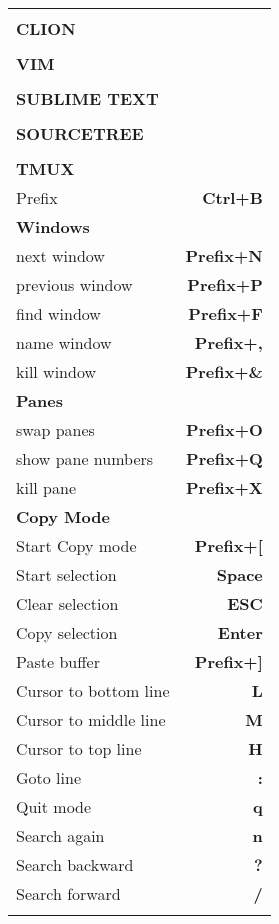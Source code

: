 \documentclass[9pt,a4paper,landscape,draft,sans]{scrartcl}
\makeatletter
\newcommand\Ctl{Ctrl}
\newcommand\Ent{Enter}
\newcommand\Prf{Prefix}
\newcommand\Esc{ESC}
\let\mcnewpage=\newpage
\newcommand{\TrickSupertabularIntoMulticols}{
  \renewcommand\newpage{
    \if@firstcolumn
      \hrule width\linewidth height0pt
      \columnbreak
    \else
      \mcnewpage
    \fi
  }
}
\newcommand{\theader}[1]{
    \rule{0pt}{6ex} \\
    \textbf{\uppercase{#1}} & \\
    \noalign{\global\arrayrulewidth=1.5pt}
    \hline
}
\newcommand{\tsubheader}[1]{
    \textbf{#1} & \\
    \noalign{\global\arrayrulewidth=0.5pt}
    \hline
}
\newcommand{\tshortcut}[2]{
    #1 & \textbf{#2} \\
    \noalign{\global\arrayrulewidth=0.5pt}
    \hline
}
\makeatother
\begin{document}
\begin{multicols}{3}

\TrickSupertabularIntoMulticols
\begin{supertabular}{@{}p{5cm}r@{}}
    \theader{CLion}
    \theader{Vim}
    \theader{Sublime text}
    \theader{SourceTree}

    \theader{Tmux}
    \tshortcut{\Prf}{\Ctl+B}
    \tsubheader{Windows}
    \tshortcut{next window}{\Prf+N}
    \tshortcut{previous window}{\Prf+P}
    \tshortcut{find window}{\Prf+F}
    \tshortcut{name window}{\Prf+,}
    \tshortcut{kill window}{\Prf+\&}
    \tsubheader{Panes}
    \tshortcut{swap panes}{\Prf+O}
    \tshortcut{show pane numbers}{\Prf+Q}
    \tshortcut{kill pane}{\Prf+X}
    \tsubheader{Copy Mode}
    \tshortcut{Start Copy mode}{\Prf+[}
    \tshortcut{Start selection}{Space}
    \tshortcut{Clear selection}{\Esc}
    \tshortcut{Copy selection}{\Ent}
    \tshortcut{Paste buffer}{\Prf+]}
    \tshortcut{Cursor to bottom line}{L}
    \tshortcut{Cursor to middle line}{M}
    \tshortcut{Cursor to top line}{H}
    \tshortcut{Goto line}{:}
    \tshortcut{Quit mode}{q}
    \tshortcut{Search again}{n}
    \tshortcut{Search backward}{?}
    \tshortcut{Search forward}{/}
\end{supertabular}

\end{multicols}
\end{document}

